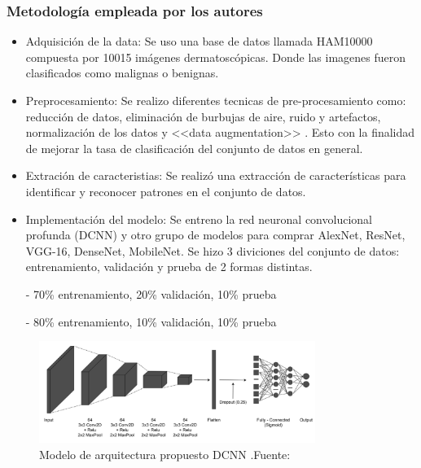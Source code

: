\subsubsection{Metodología empleada por los autores}
\newcommand{\MEone}{ Adquisición de la data: Se uso una base de datos llamada HAM10000 compuesta por 10015 imágenes dermatoscópicas. Donde las imagenes fueron clasificados como malignas o benignas.
}
\newcommand{\MEtwo}{ Preprocesamiento: Se realizo diferentes tecnicas de pre-procesamiento como: reducción de datos, eliminación de burbujas de aire, ruido y artefactos, normalización de los datos y <<data augmentation>> . Esto con la finalidad de mejorar la tasa de clasificación del conjunto de datos en general. 
}

\newcommand{\MEthree}{ Extración de caracteristias: Se realizó una extracción de características para identificar y reconocer patrones en el conjunto de datos. 
}
\newcommand{\MEfour}{Implementación del modelo: Se entreno la red neuronal convolucional profunda (DCNN) y otro grupo de modelos para comprar AlexNet, ResNet, VGG-16, DenseNet, MobileNet.
Se hizo 3 diviciones del conjunto de datos: entrenamiento, validación y prueba de 2 formas distintas.

- 70\% entrenamiento, 20\% validación, 10\% prueba

- 80\% entrenamiento, 10\% validación, 10\% prueba
}



\begin{itemize}
	\item \MEone
	\item \MEtwo
	\item \MEthree
	\item \MEfour

\end{itemize}

\begin{figure}[h]
	\begin{center}
		\includegraphics[width=0.8\textwidth]{2/figuras/Problematica_An_enhanced_tecniques_imagen_02.png}
		\caption{Modelo de arquitectura propuesto DCNN .Fuente: \cite{ali_2021enhanced}}
		\label{1:fig 5}
	\end{center}
\end{figure}


